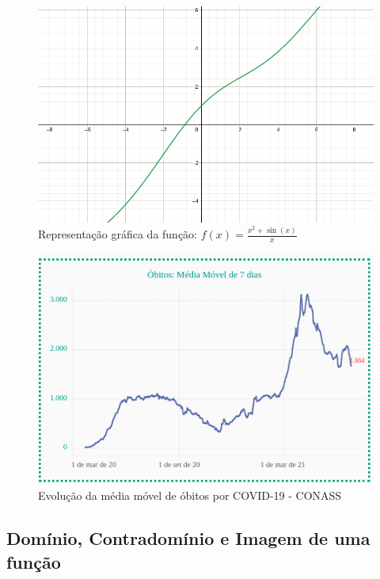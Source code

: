 \begin{multicols*}{2}
\begin{enumerate}
                    
                \end{enumerate}
                     \begin{figure}[H]
                        \caption{Representação gráfica da função: $f(x) = \frac{ x^2 + \sin(x) }{x}$}
                        \includegraphics[scale=0.3]{assets/rafael/img3.png}
                    \end{figure}
                    
                     \begin{figure}[H]
                        \caption{Evolução da média móvel de óbitos por COVID-19 - CONASS}
                        \includegraphics[scale=0.5]{assets/rafael/img4.png}
                    \end{figure}	
                    
                    
            \subsection*{Domínio, Contradomínio e Imagem de uma função}
            

\end{multicols*}
